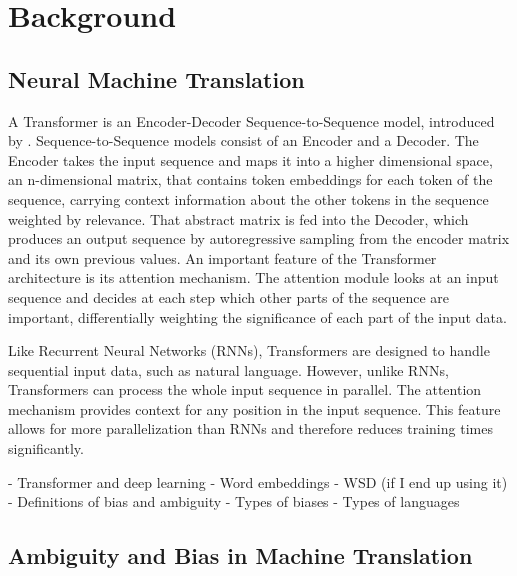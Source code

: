 \chapter{Background}
\label{ch:Background}


\section{Neural Machine Translation}
\label{sec:Introduction:NMT}

A Transformer is an Encoder-Decoder Sequence-to-Sequence model, introduced by \cite{transformer}. Sequence-to-Sequence models consist of an Encoder and a Decoder. The Encoder takes the input sequence and maps it into a higher dimensional space, an n-dimensional matrix, that contains token embeddings for each token of the sequence, carrying context information about the other tokens in the sequence weighted by relevance. That abstract matrix is fed into the Decoder, which produces an output sequence by autoregressive sampling from the encoder matrix and its own previous values. An important feature of the Transformer architecture is its attention mechanism. The attention module looks at an input sequence and decides at each step which other parts of the sequence are important, differentially weighting the significance of each part of the input data. 

Like Recurrent Neural Networks (RNNs), Transformers are designed to handle sequential input data, such as natural language. However, unlike RNNs, Transformers can process the whole input sequence in parallel. The attention mechanism provides context for any position in the input sequence. This feature allows for more parallelization than RNNs and therefore reduces training times significantly.


- Transformer and deep learning
- Word embeddings
- WSD (if I end up using it)
- Definitions of bias and  ambiguity
- Types of biases
- Types of languages

\section{Ambiguity and Bias in Machine Translation}
\label{sec:Introduction:Ambiguity_Bias}



